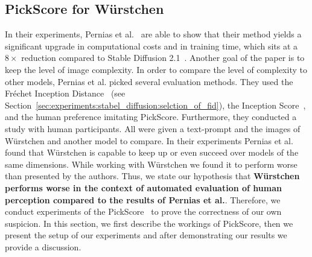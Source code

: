 \subsection{PickScore for W\"urstchen}
In their experiments, Pernias et al.~\cite{pernias2024wrstchen} are able to show
that their method yields a significant upgrade in computational costs and in
training time, which sits at a $8\times$ reduction compared to Stable Diffusion
2.1~\cite{rombach2023sd_2_1}. Another goal of the paper is to keep the level of
image complexity. In order to compare the level of complexity to other models,
Pernias et al. picked several evaluation methods. They used the
Fr\'echet Inception Distance~\cite{heusel2018ganstrainedtimescaleupdate} (see
Section~\ref{sec:experiments:stabel_diffusion:selction_of_fid}), the Inception
Score~\cite{ding2021cogviewmasteringtexttoimagegeneration}, and the human preference imitating
PickScore. Furthermore, they conducted a study with human participants. All were
given a text-prompt and the images of W\"urstchen and another model to compare.
In their experiments Pernias et al. found that W\"urstchen is capable to keep up or
even succeed over models of the same dimensions. While working with W\"urstchen
we found it to perform worse than presented by the authors. Thus, we
state our hypothesis that \textbf{W\"urstchen performs worse in the context of
    automated evaluation of human perception compared to the results of Pernias et al.}. Therefore, we
conduct experiments of the PickScore~\cite{kirstain2023pickapic} to
prove the correctness of our own suspicion. In this section, we first describe
the workings of PickScore, then we present the setup of our experiments and
after demonstrating our results we provide a discussion.


